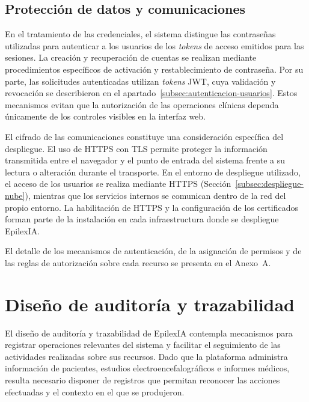 \subsection{Protección de datos y comunicaciones}
\label{subsec:proteccion-datos-comunicaciones}

En el tratamiento de las credenciales, el sistema distingue las contraseñas utilizadas para autenticar a los usuarios de los \textit{tokens} de acceso emitidos para las sesiones. La creación y recuperación de cuentas se realizan mediante procedimientos específicos de activación y restablecimiento de contraseña. Por su parte, las solicitudes autenticadas utilizan \textit{tokens} JWT, cuya validación y revocación se describieron en el apartado~\ref{subsec:autenticacion-usuarios}. Estos mecanismos evitan que la autorización de las operaciones clínicas dependa únicamente de los controles visibles en la interfaz web.

El cifrado de las comunicaciones constituye una consideración específica del despliegue. El uso de HTTPS con TLS permite proteger la información transmitida entre el navegador y el punto de entrada del sistema frente a su lectura o alteración durante el transporte. En el entorno de despliegue utilizado, el acceso de los usuarios se realiza mediante HTTPS (Sección~\ref{subsec:despliegue-nube}), mientras que los servicios internos se comunican dentro de la red del propio entorno. La habilitación de HTTPS y la configuración de los certificados forman parte de la instalación en cada infraestructura donde se despliegue EpilexIA.

\begin{nuevotexto}
El detalle de los mecanismos de autenticación, de la asignación de permisos y de las reglas de autorización sobre cada recurso se presenta en el Anexo~A.
\end{nuevotexto}

\section{Diseño de auditoría y trazabilidad}
\label{sec:diseno-auditoria-trazabilidad}

El diseño de auditoría y trazabilidad de EpilexIA contempla mecanismos para registrar operaciones relevantes del sistema y facilitar el seguimiento de las actividades realizadas sobre sus recursos. Dado que la plataforma administra información de pacientes, estudios electroencefalográficos e informes médicos, resulta necesario disponer de registros que permitan reconocer las acciones efectuadas y el contexto en el que se produjeron.

